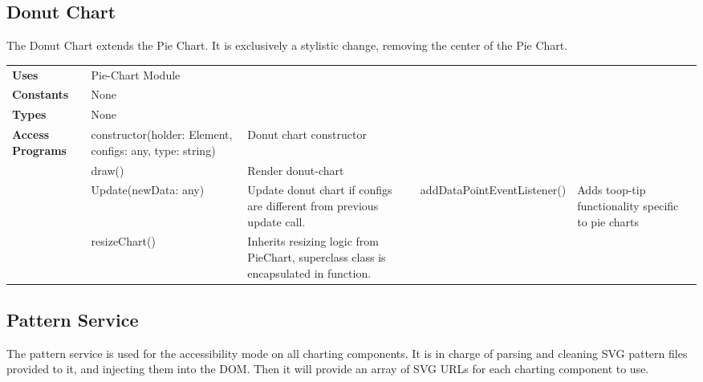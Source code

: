 \documentclass[12pt, titlepage]{article}
\begin{document}
\newpage
\subsection{Donut Chart}
The Donut Chart extends the Pie Chart. It is exclusively a stylistic change, removing the center of the Pie Chart.

\begin{table}[H]
\begin{tabular}{l p{5cm}p{5cm}}
\textbf{Uses}            & Pie-Chart Module                     &                                                                                                                  \\
\textbf{Constants}       & None                             &                                                                                                     \\
                         
\textbf{Types}           & None                                       &                                                                                                                  \\
\textbf{Access Programs} & constructor(holder: Element, configs: any, type: string) & Donut chart constructor                                                                                            \\
                         & draw()                                     & Render donut-chart  \\
                         & Update(newData: any)                       & Update donut chart if configs are different from previous update call.
                         & addDataPointEventListener()                & Adds toop-tip functionality specific to pie charts                                                               \\
                         & resizeChart()                              & Inherits resizing logic from PieChart, superclass class is encapsulated in function.\\  
\end{tabular}
\end{table}


\newpage
\subsection{Pattern Service}
The pattern service is used for the accessibility mode on all charting components. It is in charge of parsing and cleaning SVG pattern files provided to it, and injecting them into the DOM. Then it will provide an array of SVG URLs for each charting component to use.
\end{document}
